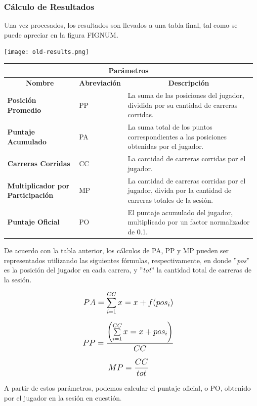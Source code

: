 \subsubsection{Cálculo de Resultados}
Una vez procesados, los resultados son llevados a una tabla final, tal como se puede apreciar en la figura FIGNUM.

\texttt{[image: old-results.png]}

\begin{center}
	\begin{tabular}{ | p{5cm} | l | p{8cm} |}
		\hline
		\multicolumn{3}{|c|}{\textbf{Parámetros}} \\
		\hline
		\multicolumn{1}{|c|}{\textbf{Nombre}} & \multicolumn{1}{|c|}{\textbf{Abreviación}} & \multicolumn{1}{|c|}{\textbf{Descripción}} \\
		\hline
		{\textbf{Posición Promedio}} & PP & La suma de las posiciones del jugador, dividida por su cantidad de carreras corridas. \\ \hline
		{\textbf{Puntaje Acumulado}} & PA & La suma total de los puntos correspondientes a las posiciones obtenidas por el jugador. \\ \hline
		{\textbf{Carreras Corridas}} & CC & La cantidad de carreras corridas por el jugador. \\ \hline
		{\textbf{Multiplicador por Participación}} & MP & La cantidad de carreras corridas por el jugador, divida por la cantidad de carreras totales de la sesión. \\ \hline
		{\textbf{Puntaje Oficial}} & PO & El puntaje acumulado del jugador, multiplicado por un factor normalizador de 0.1. \\ \hline
	\end{tabular}
\end{center}


De acuerdo con la tabla anterior, los cálculos de PA, PP y MP pueden ser representados utilizando las siguientes fórmulas, respectivamente, en donde ''\textit{pos}'' es la posición del jugador en cada carrera, y ''\textit{tot}'' la cantidad total de carreras de la sesión.

\[
\mathlarger{{PA} = \sum_{i=1}^{CC}x=x+f(pos_i)}
\]

\[
\mathlarger{{PP} = \frac{\left(\sum\limits_{i=1}^{CC}x=x+pos_i\right)}{CC}}
\]

\[
\mathlarger{{MP} = \frac{CC}{tot}}
\]

A partir de estos parámetros, podemos calcular el puntaje oficial, o PO, obtenido por el jugador en la sesión en cuestión.

